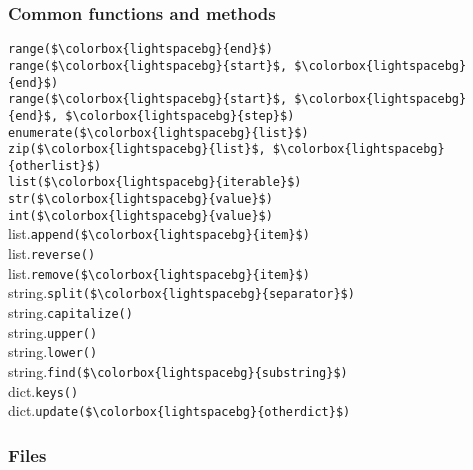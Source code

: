 \documentclass[12pt,twocolumn]{article}
\begin{document}
	\subsubsection*{Common functions and methods}
	
	\lstinline|range($\colorbox{lightspacebg}{end}$)| \\
	\lstinline|range($\colorbox{lightspacebg}{start}$, $\colorbox{lightspacebg}{end}$)| \\
	\lstinline|range($\colorbox{lightspacebg}{start}$, $\colorbox{lightspacebg}{end}$, $\colorbox{lightspacebg}{step}$)| \\
	
	\lstinline|enumerate($\colorbox{lightspacebg}{list}$)| \\
	\lstinline|zip($\colorbox{lightspacebg}{list}$, $\colorbox{lightspacebg}{otherlist}$)| \\
	
	\lstinline|list($\colorbox{lightspacebg}{iterable}$)| \\
	\lstinline|str($\colorbox{lightspacebg}{value}$)| \\
	\lstinline|int($\colorbox{lightspacebg}{value}$)| \\
	
	list.\lstinline|append($\colorbox{lightspacebg}{item}$)| \\
	list.\lstinline|reverse()| \\
	list.\lstinline|remove($\colorbox{lightspacebg}{item}$)| \\
	
	string.\lstinline|split($\colorbox{lightspacebg}{separator}$)| \\
	string.\lstinline|capitalize()| \\
	string.\lstinline|upper()| \\
	string.\lstinline|lower()| \\
	string.\lstinline|find($\colorbox{lightspacebg}{substring}$)| \\
	
	dict.\lstinline|keys()| \\
	dict.\lstinline|update($\colorbox{lightspacebg}{otherdict}$)| \\
	
	\subsubsection*{Files}
	
\end{document}
